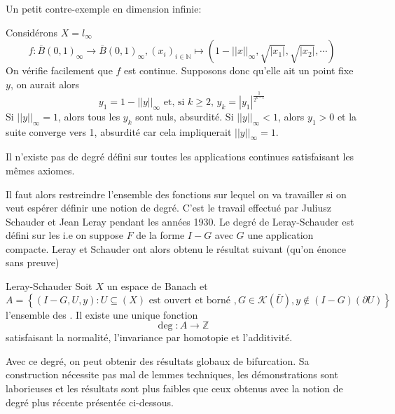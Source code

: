 \documentclass[memoire.tex]{subfiles}
\begin{document}
Un petit contre-exemple en dimension infinie:
\begin{exemple}
    Considérons $X=l_\infty$ 
    \begin{equation*}
        f: \bar{B}(0,1)_{\infty}\rightarrow \bar{B}(0,1)_{\infty}
    , (x_i)_{i\in\mathbb{N}}\mapsto 
        (1-||x||_{\infty},\sqrt{|x_1|},\sqrt{|x_2|},\cdots)
    \end{equation*}
    On vérifie facilement que $f$ est continue. Supposons donc qu'elle ait un point fixe $y$, on aurait alors 
    \begin{equation*}
        y_1= 1- ||y||_{\infty}\text{ et, si $k\geq 2$,  } y_k = |y_1|^{\frac{1}{2^{k-1}}}
    \end{equation*}
    Si $||y||_\infty=1$,  alors tous les $y_k$ sont nuls, absurdité. Si $||y||_\infty<1$, alors $y_1>0$ et la suite converge vers 1, absurdité car cela impliquerait $||y||_{\infty}=1$.
\end{exemple}
\begin{corollaire}
    Il n’existe pas de degré défini sur toutes les applications continues satisfaisant les mêmes axiomes.
\end{corollaire}
Il faut alors restreindre l'ensemble des fonctions sur lequel on va travailler si on veut espérer définir une notion de degré. C'est le travail effectué par  Juliusz Schauder et  Jean Leray pendant les années 1930.
Le degré de Leray-Schauder est défini sur les  i.e on suppose $F$ de la forme $I-G$ avec $G$ une application compacte. Leray et Schauder ont alors obtenu le résultat suivant
(qu'on énonce sans preuve) 

\begin{theobox}{Leray-Schauder}{}
    Soit $X$ un espace de Banach et 
    \begin{equation*}
        A=\left\{
            (I-G,U,y): U \subseteq(X)\text{ est ouvert et borné },G\in\mathcal{K}(\bar{U}),y\notin (I-G)(\partial U)
        \right \}
    \end{equation*}
    l'ensemble des .
    Il existe une unique fonction 
    \begin{equation*}
        \operatorname{deg}: A\rightarrow \mathbb{Z}
    \end{equation*}
    satisfaisant la normalité, l'invariance par homotopie et l'additivité.
\end{theobox}


Avec ce degré, on peut obtenir des résultats globaux de bifurcation. Sa construction nécessite pas mal de lemmes techniques, les démonstrations sont laborieuses et les résultats sont plus faibles que ceux obtenus avec la notion de degré plus récente présentée ci-dessous.
\end{document}
